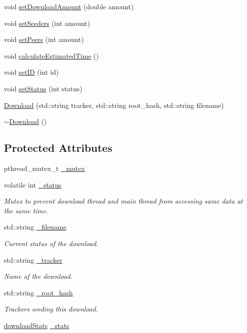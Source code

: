 \begin{DoxyCompactItemize}
\item 
void \hyperlink{classDownload_a3a05a45f983fcb09b8dbb41a8e329fee}{setDownloadAmount} (double amount)
\item 
void \hyperlink{classDownload_a5c1916b705f784476de6af532fd6f8b6}{setSeeders} (int amount)
\item 
void \hyperlink{classDownload_ab4f8aeb520296d4a92a8385e9f5e8465}{setPeers} (int amount)
\item 
void \hyperlink{classDownload_af70a0bffe0a3b6e3b5ceea8bc580caad}{calculateEstimatedTime} ()
\item 
void \hyperlink{classDownload_ad8b091c43ea6186eaabcbffb9ac64964}{setID} (int id)
\item 
void \hyperlink{classDownload_a8e9fc85664ce8647bdd99cae8aa3d4e6}{setStatus} (int status)
\item 
\hyperlink{classDownload_ad9edab4ad8449438e8e6c17669d5b864}{Download} (std::string tracker, std::string root\_\-hash, std::string filename)
\item 
\hyperlink{classDownload_a57f3bb355e0f7b0cd10996c7e78b67b8}{$\sim$Download} ()
\end{DoxyCompactItemize}
\subsection*{Protected Attributes}
\begin{DoxyCompactItemize}
\item 
pthread\_\-mutex\_\-t \hyperlink{classDownload_ab73d857fa4f5082ea72a91d1df0c769f}{\_\-mutex}
\item 
volatile int \hyperlink{classDownload_a562511e0630169011935c79ba0367872}{\_\-status}
\begin{DoxyCompactList}\small\item\em Mutex to prevent download thread and main thread from accessing same data at the same time. \end{DoxyCompactList}\item 
std::string \hyperlink{classDownload_ad752e7e42378b43549ac3378802c9220}{\_\-filename}
\begin{DoxyCompactList}\small\item\em Current status of the download. \end{DoxyCompactList}\item 
std::string \hyperlink{classDownload_a22071fe4126b403c73bf2290348a4bb1}{\_\-tracker}
\begin{DoxyCompactList}\small\item\em Name of the download. \end{DoxyCompactList}\item 
std::string \hyperlink{classDownload_a3e7db6fe59ed31d8e69b365e117a9847}{\_\-root\_\-hash}
\begin{DoxyCompactList}\small\item\em Trackers seeding this download. \end{DoxyCompactList}\item 
\hyperlink{structDownload_1_1downloadStats}{downloadStats} \hyperlink{classDownload_a7bf716e1095fd5dcd0157b8d846debc0}{\_\-stats}
\end{DoxyCompactItemize}


